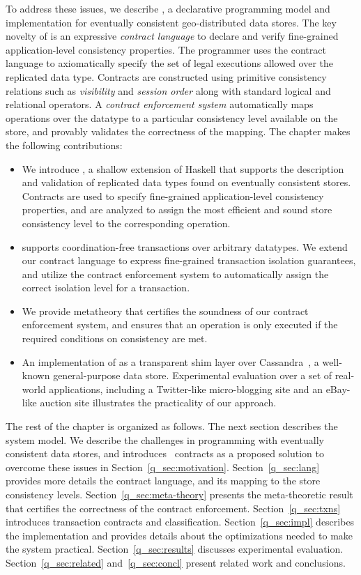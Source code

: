 To address these issues, we describe \quelea, a declarative programming model
and implementation for eventually consistent geo-distributed data stores. The
key novelty of \quelea is an expressive \emph{contract language} to declare and
verify fine-grained application-level consistency properties. The programmer
uses the contract language to axiomatically specify the set of legal executions
allowed over the replicated data type. Contracts are constructed using
primitive consistency relations such as \emph{visibility} and \emph{session
order} along with standard logical and relational operators. A \emph{contract
enforcement system} automatically maps operations over the datatype to a
particular consistency level available on the store, and provably validates the
correctness of the mapping.  The chapter makes the following contributions:

\begin{itemize}
\item We introduce \quelea, a shallow extension of Haskell that supports the
	description and validation of replicated data types found on eventually
	consistent stores. Contracts are used to specify fine-grained
	application-level consistency properties, and are analyzed to assign the most
	efficient and sound store consistency level to the corresponding operation.
\item \quelea supports coordination-free transactions over arbitrary datatypes.
	We extend our contract language to express fine-grained transaction isolation
	guarantees, and utilize the contract enforcement system to automatically
	assign the correct isolation level for a transaction.
\item We provide metatheory that certifies the soundness of our contract
	enforcement system, and ensures that an operation is only executed if the
	required conditions on consistency are met.
\item An implementation of \quelea as a transparent shim layer over
	Cassandra~\cite{Lakshman2010}, a well-known general-purpose data store.
	Experimental evaluation over a set of real-world applications, including a
	Twitter-like micro-blogging site and an eBay-like auction site illustrates
	the practicality of our approach.
\end{itemize}

The rest of the chapter is organized as follows. The next section describes the
system model.  We describe the challenges in programming with eventually
consistent data stores, and introduces \quelea\ contracts as a proposed
solution to overcome these issues in Section~\ref{q_sec:motivation}.
Section~\ref{q_sec:lang} provides more details the contract language, and its
mapping to the store consistency levels. Section~\ref{q_sec:meta-theory}
presents the meta-theoretic result that certifies the correctness of the
\quelea contract enforcement. Section~\ref{q_sec:txns} introduces transaction
contracts and classification. Section~\ref{q_sec:impl} describes the
implementation and provides details about the optimizations needed to make the
system practical. Section~\ref{q_sec:results} discusses experimental
evaluation. Section~\ref{q_sec:related} and~\ref{q_sec:concl} present related
work and conclusions.

